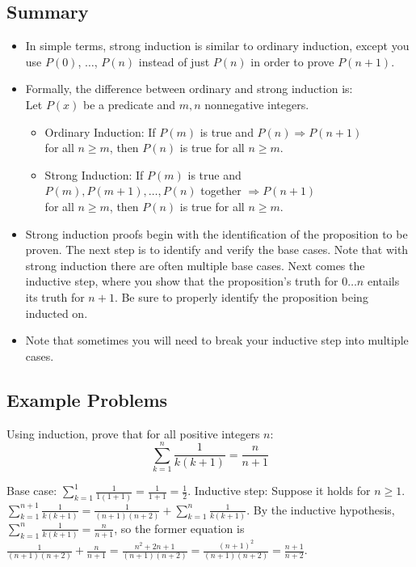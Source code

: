 \documentclass[solution, letterpaper]{cs20}
\begin{document}
	\subsection{Summary}
        \begin{itemize}
            \item In simple terms, strong induction is similar to ordinary induction, except you use $P(0)$, $\ldots$, $P(n)$ instead of just $P(n)$ in order to prove $P(n+1)$.
            \item Formally, the difference between ordinary and strong induction is:\\
            Let $P(x)$ be a predicate and $m,n$ nonnegative integers.
            \begin{itemize}
                \item Ordinary Induction: If $P(m)$ is true and $P(n) \Rightarrow P(n+1)$\\ for all $n \geq m$, then $P(n)$ is true for all $n \geq m$.
                \item Strong Induction: If $P(m)$ is true and\\ $P(m), P(m+1), \dots, P(n)$ together $\Rightarrow P(n+1)$\\
                for all $n \geq m$, then $P(n)$ is true for all $n \geq m$.
            \end{itemize}
            \item Strong induction proofs begin with the identification of the proposition to be proven. The next step is to identify and verify the base cases. Note that with strong induction there are often multiple base cases. Next comes the inductive step, where you show that the proposition's truth for $0\ldots n$ entails its truth for $n+1$. Be sure to properly identify the proposition being inducted on.
            \item Note that sometimes you will need to break your inductive step into multiple cases.
        \end{itemize}

    \subsection{Example Problems}
        \problem{}{}

        Using induction, prove that for all positive integers $n$:
        $$
        \sum_{k=1}^{n}\frac{1}{k(k+1)}=\frac{n}{n+1}
        $$

        \begin{solution}

        Base case: $\sum_{k=1}^{1}\frac{1}{1(1+1)}=\frac{1}{1+1} = \frac{1}{2}$. Inductive step: Suppose it holds for $n \ge 1$.  $\sum_{k=1}^{n+1}\frac{1}{k(k+1)} = \frac{1}{(n+1)(n+2)} + \sum_{k=1}^{n}\frac{1}{k(k+1)}$. By the inductive hypothesis, $\sum_{k=1}^{n}\frac{1}{k(k+1)} = \frac{n}{n+1}$, so the former equation is $\frac{1}{(n+1)(n+2)} + \frac{n}{n+1} = \frac{n^2 + 2n+1}{(n+1)(n+2)} = \frac{(n+1)^2}{(n+1)(n+2)} = \frac{n+1}{n+2}$.

        \end{solution}
\end{document}
